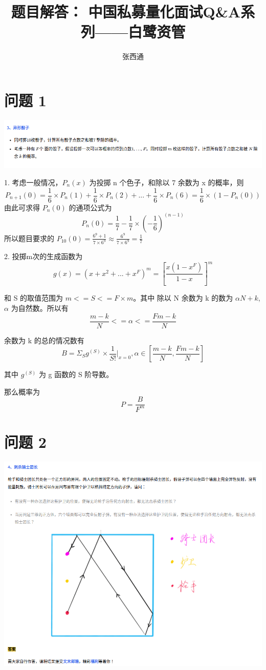 \documentclass{article}
\title{题目解答： 中国私募量化面试Q&A系列——白鹭资管}
\author{张西通}
\date{}
\begin{document}
\section{问题 1}
\includegraphics[scale=0.5]{dice.png}

1. 考虑一般情况，$P_n(x)$ 为投掷 n 个色子，和除以 7 余数为 x 的概率，则
$$
P_{n+1}(0) = \frac{1}{6} \times P_n(1) + \frac{1}{6} \times P_n(2) + ... + \frac{1}{6} \times P_n(6) = \frac{1}{6} \times (1 - P_n(0)) 
$$
由此可求得 $P_n(0)$ 的通项公式为
$$
P_n(0) = \frac{1}{7} - \frac{1}{7}\times(-\frac{1}{6})^{(n-1)}
$$
所以题目要求的 $P_{10}(0) = \frac{6^9 + 1}{7 \times 6^9} \approx \frac{6^9}{7 \times 6^9} = \frac{1}{7}$

\vspace{60pt}
2. 投掷m次的生成函数为
$$
g(x) = (x + x^2 + ... + x^F)^m = [\frac{x(1-x^F)}{1-x}]^m
$$

和 S 的取值范围为 $m <= S <= F \times m $。其中 除以 N 余数为 k 的数为 $ \alpha N + k $, $\alpha$ 为自然数。所以有
$$
\frac{m-k}{N} <= \alpha <= \frac{Fm-k}{N}
$$

余数为 k 的总的情况数有
$$
B = \Sigma_S g^{(S)} \times \frac{1}{S!} |_{x=0},  \alpha \in [\frac{m-k}{N}, \frac{Fm-k}{N}] 
$$

其中 $g^{(S)}$ 为 g 函数的 S 阶导数。

那么概率为
$$
P = \frac{B}{F^m}
$$





\newpage
\section{问题 2}
\includegraphics[scale=0.5]{knight.png}
\end{document}
